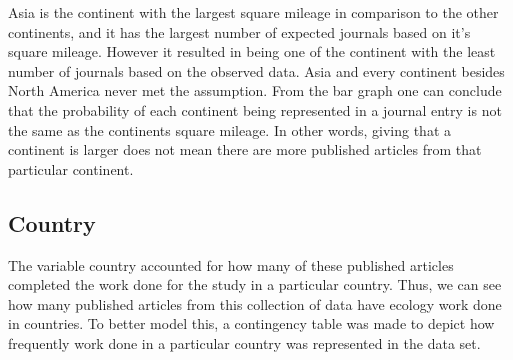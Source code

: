 \documentclass[12pt, letterpaper]{article}
\begin{document}
Asia is the continent with the largest square mileage in comparison to the other continents, and it has the largest number of expected journals based on it's square mileage. However it resulted in being one of the continent with the least number of journals based on the observed data. Asia and every continent besides North America never met the assumption. From the bar graph one can conclude that the probability of each continent being represented in a journal entry is not the same as the continents square mileage. In other words, giving that a continent is larger does not mean there are more published articles from that particular continent.

\pagebreak

\subsection{Country}
The variable country accounted for how many of these published articles completed the work done for the study in a particular country. Thus, we can see how many published articles from this collection of data have ecology work done in countries. To better model this, a contingency table was made to depict how frequently work done in a particular country was represented in the data set.
\end{document}
